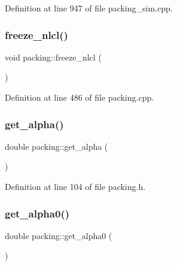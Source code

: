 Definition at line 947 of file packing\+\_\+sim.\+cpp.

\mbox{\label{classpacking_aff094d1084949ed63ca374373e8d312b}} 
\subsubsection{\texorpdfstring{freeze\+\_\+nlcl()}{freeze\_nlcl()}}
{\footnotesize\ttfamily void packing\+::freeze\+\_\+nlcl (\begin{DoxyParamCaption}{ }\end{DoxyParamCaption})}



Definition at line 486 of file packing.\+cpp.

\mbox{\label{classpacking_a366b4efa1f1fecf098df6bb9af09e739}} 
\subsubsection{\texorpdfstring{get\+\_\+alpha()}{get\_alpha()}}
{\footnotesize\ttfamily double packing\+::get\+\_\+alpha (\begin{DoxyParamCaption}{ }\end{DoxyParamCaption})\hspace{0.3cm}{\ttfamily [inline]}}



Definition at line 104 of file packing.\+h.

\mbox{\label{classpacking_a357aeeeac709d7926cbbaa9312cf3649}} 
\subsubsection{\texorpdfstring{get\+\_\+alpha0()}{get\_alpha0()}}
{\footnotesize\ttfamily double packing\+::get\+\_\+alpha0 (\begin{DoxyParamCaption}{ }\end{DoxyParamCaption})\hspace{0.3cm}{\ttfamily [inline]}}



